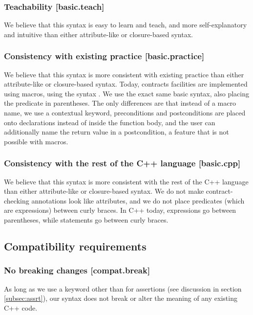 \subsubsection{Teachability  [basic.teach]}

We believe that this syntax is easy to learn and teach, and more self-explanatory and intuitive than either attribute-like or closure-based syntax.

\subsubsection{Consistency with existing practice  [basic.practice]}

We believe that this syntax is more consistent with existing practice than either attribute-like or closure-based syntax. Today, contracts facilities are implemented using macros, using the syntax . We use the exact same basic syntax, also placing the predicate in parentheses. The only differences are that instead of a macro name, we use a contextual keyword, preconditions and postconditions are placed onto declarations instead of inside the function body, and the user can additionally name the return value in a postcondition, a feature that is not possible with macros.

\subsubsection{Consistency with the rest of the C++ language  [basic.cpp]}

We believe that this syntax is more consistent with the rest of the C++ language than either attribute-like or closure-based syntax. We do not make contract-checking annotations look like attributes, and we do not place predicates (which are expressions) between curly braces. In C++ today, expressions go between parentheses, while statements go between curly braces.

\subsection{Compatibility requirements}

\subsubsection{No breaking changes  [compat.break]}

As long as we use a keyword other than  for assertions (see discussion in section \ref{subsec:assrt}), our syntax does not break or alter the meaning of any existing C++ code.

